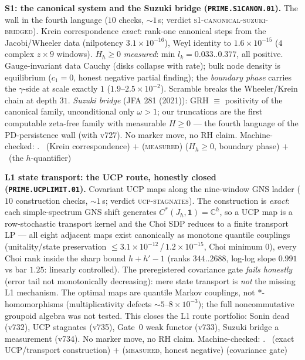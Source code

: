 \par\smallskip\noindent\textbf{S1: the canonical system and the
Suzuki bridge (\texttt{PRIME.S1CANON.01}).}
The wall in the fourth language ($10$ checks, ${\sim}1$\,s; verdict
\textsc{s1-canonical-suzuki-bridged}).  Krein correspondence
\emph{exact}: rank-one canonical steps from the Jacobi/Wheeler data
(nilpotency $3.1\times10^{-16}$), Weyl identity to
$1.6\times10^{-15}$ ($4$ complex $z\times9$ windows).  $H_h\ge0$
\emph{measured}: min $l_k=0.033..0.377$, all positive.
Gauge-invariant data Cauchy (disks collapse with rate); bulk node
density is equilibrium ($c_1=0$, honest negative partial finding);
the \emph{boundary phase} carries the $\gamma$-side at scale
exactly $1$ ($1.9$--$2.5\times10^{-2}$).  Scramble breaks the
Wheeler/Krein chain at depth $31$.  \emph{Suzuki bridge} (JFA 281
(2021)): GRH $\equiv$ positivity of the canonical family,
unconditional only $\omega>1$; our truncations are the first
computable zeta-free family with measurable $H\ge0$ --- the fourth
language of the PD-persistence wall (with v727).  No marker move,
no RH claim.
Machine-checked: .
\mE\ (Krein correspondence) $+$ (\textsc{measured}) ($H_h\ge0$,
boundary phase) $+$ \mO\ (the $h$-quantifier)
\par\smallskip


\par\smallskip\noindent\textbf{L1 state transport: the UCP route,
honestly closed (\texttt{PRIME.UCPLIMIT.01}).}
Covariant UCP maps along the nine-window GNS ladder ($10$
construction checks, ${\sim}1$\,s; verdict \textsc{ucp-stagnates}).
The construction is \emph{exact}: each simple-spectrum GNS shift
generates $C^*(J_h,\mathbf 1)=\mathbb C^h$, so a UCP map is a
row-stochastic transport kernel and the Choi SDP reduces to a finite
transport LP --- all eight adjacent maps exist canonically as
monotone quantile couplings (unitality/state preservation
$\le3.1\times10^{-12}$\,/\,$1.2\times10^{-15}$, Choi minimum $0$),
every Choi rank inside the sharp bound $h+h'-1$ (ranks $344..2688$,
log-log slope $0.991$ vs bar $1.25$: linearly controlled).  The
preregistered covariance gate \emph{fails honestly} (error tail not
monotonically decreasing): mere state transport is \emph{not} the
missing L1 mechanism.  The optimal maps are quantile Markov
couplings, not $*$-homomorphisms (multiplicativity defects
${\sim}5$--$8\times10^{-3}$); the full noncommutative groupoid
algebra was not tested.  This closes the L1 route portfolio: Sonin
dead (v732), UCP stagnates (v735), Gate~0 weak functor (v733),
Suzuki bridge a measurement (v734).  No marker move, no RH claim.
Machine-checked: .
\mE\ (exact UCP/transport construction) $+$ (\textsc{measured},
honest negative) (covariance gate)
\par\smallskip


